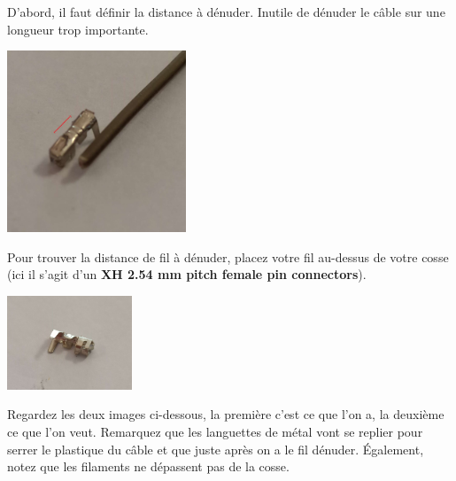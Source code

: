 \documentclass{article}
\begin{document}
D'abord, il faut définir la distance à dénuder. Inutile de dénuder le câble sur une longueur trop importante.

\begin{minipage}{\textwidth}
    \vspace{0.5cm}
    \begin{center}
    \includegraphics[width=0.4\textwidth]{images/choisir_longeur_a_denuder.jpg}
    \captionsetup{labelformat=empty}
    \end{center}
    \vspace{0.5cm}
\end{minipage}

Pour trouver la distance de fil à dénuder, placez votre fil au-dessus de votre cosse (ici il s'agit d'un \textbf{XH 2.54 mm pitch female pin connectors}). 

\begin{minipage}{\textwidth}
    \vspace{0.5cm}
    \begin{center}
    \includegraphics[width=0.28\textwidth]{images/cosse_JST.jpg}
    \captionsetup{labelformat=empty}
    \end{center}
    \vspace{0.5cm}
\end{minipage}

Regardez les deux images ci-dessous, la première c'est ce que l'on a, la deuxième ce que l'on veut. Remarquez que les languettes de métal vont se replier pour serrer le plastique du câble et que juste après on a le fil dénuder. Également, notez que les filaments ne dépassent pas de la cosse.
\end{document}
